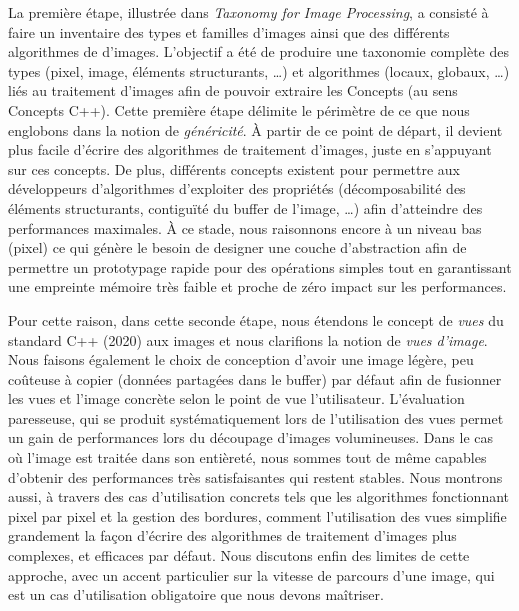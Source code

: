 La première étape, illustrée dans \emph{Taxonomy for Image Processing}, a consisté à faire un inventaire des types et
familles d'images ainsi que des différents algorithmes de d'images. L'objectif a été de produire une taxonomie complète
des types (pixel, image, éléments structurants, \ldots) et algorithmes (locaux, globaux, \ldots) liés au traitement
d'images afin de pouvoir extraire les Concepts (au sens Concepts C++). Cette première étape délimite le périmètre de ce
que nous englobons dans la notion de \emph{généricité}. \`{A} partir de ce point de départ, il devient plus facile
d'écrire des algorithmes de traitement d'images, juste en s'appuyant sur ces concepts. De plus, différents concepts
existent pour permettre aux développeurs d'algorithmes d'exploiter des propriétés (décomposabilité des éléments
structurants, contiguïté du buffer de l'image, \ldots) afin d'atteindre des performances maximales. \`{A} ce stade, nous
raisonnons encore à un niveau bas (pixel) ce qui génère le besoin de designer une couche d'abstraction afin de permettre
un prototypage rapide pour des opérations simples tout en garantissant une empreinte mémoire très faible et proche de
zéro impact sur les performances.

Pour cette raison, dans cette seconde étape, nous étendons le concept de \emph{vues} du standard C++ (2020) aux images
et nous clarifions la notion de \emph{vues d'image}. Nous faisons également le choix de conception d'avoir une image
légère, peu coûteuse à copier (données partagées dans le buffer) par défaut afin de fusionner les vues et l'image
concrète selon le point de vue l'utilisateur. L'évaluation paresseuse, qui se produit systématiquement lors de
l'utilisation des vues permet un gain de performances lors du découpage d'images volumineuses. Dans le cas où l'image
est traitée dans son entièreté, nous sommes tout de même capables d'obtenir des performances très satisfaisantes qui
restent stables. Nous montrons aussi, à travers des cas d'utilisation concrets tels que les algorithmes fonctionnant
pixel par pixel et la gestion des bordures, comment l'utilisation des vues simplifie grandement la façon d'écrire des
algorithmes de traitement d'images plus complexes, et efficaces par défaut. Nous discutons enfin des limites de cette
approche, avec un accent particulier sur la vitesse de parcours d'une image, qui est un cas d'utilisation obligatoire
que nous devons maîtriser.

